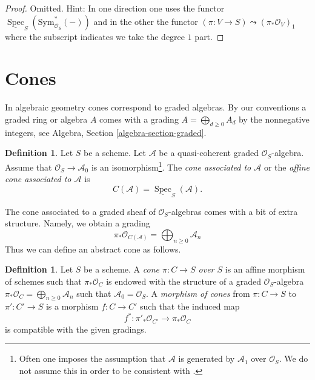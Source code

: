 \documentclass{stacks-project}
\theoremstyle{plain}
\theoremstyle{definition}
\newtheorem{definition}[subsection]{Definition}
\theoremstyle{remark}
\numberwithin{equation}{subsection}
\def\Spec{\mathop{\mathrm{Spec}}}
\begin{document}
\begin{proof}
Omitted. Hint: In one direction one uses the functor
$\underline{\Spec}_S(\text{Sym}^*_{\mathcal{O}_S}(-))$
and in the other the functor
$(\pi : V \to S) \leadsto (\pi_*\mathcal{O}_V)_1$ where the subscript
indicates we take the degree $1$ part.
\end{proof}




\section{Cones}
\label{section-cone}

\noindent
In algebraic geometry cones correspond to graded algebras. By our conventions
a graded ring or algebra $A$ comes with a grading
$A = \bigoplus_{d \geq 0} A_d$ by the nonnegative integers, see
Algebra, Section \ref{algebra-section-graded}.

\begin{definition}
\label{definition-cone}
Let $S$ be a scheme. Let $\mathcal{A}$ be a quasi-coherent
graded $\mathcal{O}_S$-algebra. Assume that $\mathcal{O}_S \to \mathcal{A}_0$
is an isomorphism\footnote{Often one imposes the assumption that
$\mathcal{A}$ is generated by $\mathcal{A}_1$ over $\mathcal{O}_S$. We do not
assume this in order to be consistent with \cite[II, (8.3.1)]{EGA}.}.
The {\it cone associated to $\mathcal{A}$} or the
{\it affine cone associated to $\mathcal{A}$}
is
$$
C(\mathcal{A}) = \underline{\Spec}_S(\mathcal{A}).
$$
\end{definition}

\noindent
The cone associated to a graded sheaf of $\mathcal{O}_S$-algebras
comes with a bit of extra structure. Namely, we obtain a grading
$$
\pi_*\mathcal{O}_{C(\mathcal{A})} =
\bigoplus\nolimits_{n \geq 0} \mathcal{A}_n
$$
Thus we can define an abstract cone as follows.

\begin{definition}
\label{definition-abstract-cone}
Let $S$ be a scheme. A {\it cone $\pi : C \to S$ over $S$} is an
affine morphism of schemes such that $\pi_*\mathcal{O}_C$ is endowed with
the structure of a graded $\mathcal{O}_S$-algebra
$\pi_*\mathcal{O}_C = \bigoplus\nolimits_{n \geq 0} \mathcal{A}_n$
such that $\mathcal{A}_0 = \mathcal{O}_S$. A {\it morphism of cones}
from $\pi : C \to S$ to $\pi' : C' \to S$
is a morphism $f : C \to C'$ such that the induced map
$$
f^* : \pi'_*\mathcal{O}_{C'} \longrightarrow \pi_*\mathcal{O}_C
$$
is compatible with the given gradings.
\end{definition}
\end{document}
